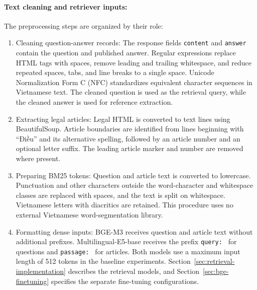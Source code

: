 \paragraph{Text cleaning and retriever inputs:}
The preprocessing steps are organized by their role:
\begin{enumerate}
    \item Cleaning question-answer records: The response fields \texttt{content} and \texttt{answer} contain the question and published answer. Regular expressions replace HTML tags with spaces, remove leading and trailing whitespace, and reduce repeated spaces, tabs, and line breaks to a single space. Unicode Normalization Form C (NFC) standardizes equivalent character sequences in Vietnamese text. The cleaned question is used as the retrieval query, while the cleaned answer is used for reference extraction.

    \item Extracting legal articles: Legal HTML is converted to text lines using BeautifulSoup. Article boundaries are identified from lines beginning with ``Điều'' and its alternative spelling, followed by an article number and an optional letter suffix. The leading article marker and number are removed where present.

    \item Preparing BM25 tokens: Question and article text is converted to lowercase. Punctuation and other characters outside the word-character and whitespace classes are replaced with spaces, and the text is split on whitespace. Vietnamese letters with diacritics are retained. This procedure uses no external Vietnamese word-segmentation library.

    \item Formatting dense inputs: BGE-M3 receives question and article text without additional prefixes. Multilingual-E5-base receives the prefix \texttt{query: } for questions and \texttt{passage: } for articles. Both models use a maximum input length of 512 tokens in the baseline experiments. Section~\ref{sec:retrieval-implementation} describes the retrieval models, and Section~\ref{sec:bge-finetuning} specifies the separate fine-tuning configurations.
\end{enumerate}


